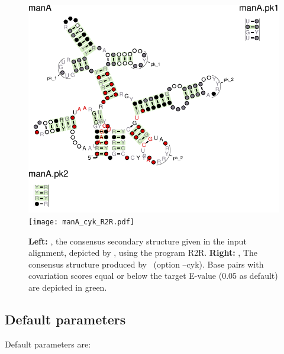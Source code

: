  \begin{figure}[h]
   \includegraphics[scale=0.7]{manA_R2R.pdf} 
  \texttt{[image: manA\_cyk\_R2R.pdf]} 
  \caption{\small\textbf{Left:}
    , the consensus
    secondary structure given in the input alignment, depicted by
    \rscape, using the program R2R.  \textbf{Right:}
    , The consensus
    structure produced by \rscape\ (option --cyk).  Base pairs with
    covariation scores equal or below the target E-value (0.05 as
    default) are depicted in green.  }
 \label{fig:manA_r2r}
 \end{figure}
 

\subsection{Default parameters}

Default parameters are:

